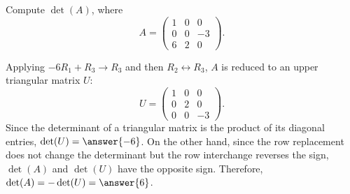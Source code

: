\documentclass{ximera}
\begin{document}
\begin{example}
  Compute $\det(A)$, where
  \[
    A =
    \begin{pmatrix}
      1 & 0 & 0 \\
      0 & 0 & -3 \\
      6 & 2 & 0
    \end{pmatrix}.
  \]
  \begin{explanation}
    Applying $-6R_1+R_3 \to R_3$ and then $R_2 \leftrightarrow R_3$, $A$ is reduced to
    an upper triangular matrix $U$:
    \[
      U =
      \begin{pmatrix}
        1 & 0 & 0 \\
        0 & 2 & 0 \\
        0 & 0 & -3
      \end{pmatrix}.
    \]
    Since the determinant of a triangular matrix is the product of its
    diagonal entries, $\det(U) = \answer{-6}$. On the other hand,
    since the row replacement does not change the determinant but the
    row interchange reverses the sign, $\det(A)$ and $\det(U)$ have
    the opposite sign. Therefore, $\det(A) = - \det(U) = \answer{6}$.

  \end{explanation}
\end{example}
\end{document}

